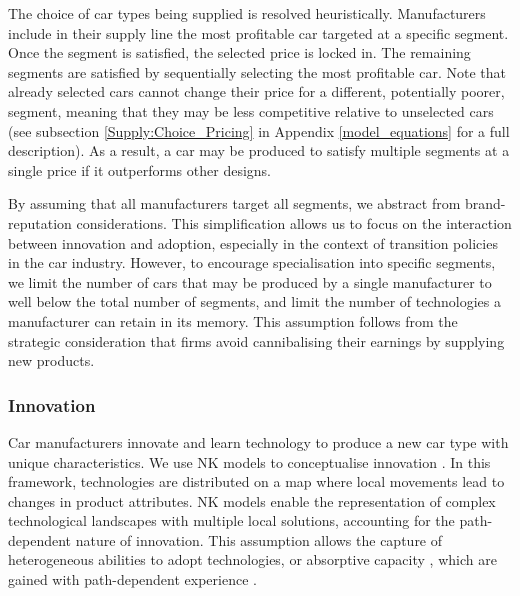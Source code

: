 \documentclass[12pt]{article}
\begin{document}
	The choice of car types being supplied is resolved heuristically. Manufacturers include in their supply line the most profitable car targeted at a specific segment. Once the segment is satisfied, the selected price is locked in. The remaining segments are satisfied by sequentially selecting the most profitable car. Note that already selected cars cannot change their price for a different, potentially poorer, segment, meaning that they may be less competitive relative to unselected cars (see subsection \ref{Supply:Choice_Pricing} in Appendix \ref{model_equations} for a full description). As a result, a car may be produced to satisfy multiple segments at a single price if it outperforms other designs. %

	By assuming that all manufacturers target all segments, we abstract from brand-reputation considerations. This simplification allows us to focus on the interaction between innovation and adoption, especially in the context of transition policies in the car industry. However, to encourage specialisation into specific segments, we limit the number of cars that may be produced by a single manufacturer to well below the total number of segments, and limit the number of technologies a manufacturer can retain in its memory. This assumption follows from the strategic consideration that firms avoid cannibalising their earnings by supplying new products.

	\subsubsection{Innovation} \label{Supply:Innovation}
	Car manufacturers innovate and learn technology to produce a new car type with unique characteristics. We use NK models to conceptualise innovation \citep{levinthal1997adaptation,rivkin_2000,baumann_siggelkow_2013}. In this framework, technologies are distributed on a map where local movements lead to changes in product attributes. NK models enable the representation of complex technological landscapes with multiple local solutions, accounting for the path-dependent nature of innovation. This assumption allows the capture of heterogeneous abilities to adopt technologies, or absorptive capacity \citep{cohen1990absorptive}, which are gained with path-dependent experience \citep{nelson1977search}.
\end{document}
